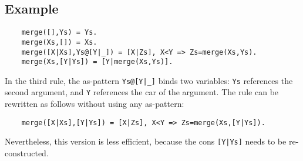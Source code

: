 \subsection*{Example}
\begin{verbatim}
    merge([],Ys) = Ys.
    merge(Xs,[]) = Xs.
    merge([X|Xs],Ys@[Y|_]) = [X|Zs], X<Y => Zs=merge(Xs,Ys). 
    merge(Xs,[Y|Ys]) = [Y|merge(Xs,Ys)].
\end{verbatim}
In the third rule, the as-pattern \texttt{Ys@[Y|\_]} binds two variables: \texttt{Ys} references the second argument, and \texttt{Y} references the car of the argument. The rule can be rewritten as follows without using any as-pattern:
\begin{verbatim}
    merge([X|Xs],[Y|Ys]) = [X|Zs], X<Y => Zs=merge(Xs,[Y|Ys]). 
\end{verbatim}
Nevertheless, this version is less efficient, because the cons \texttt{[Y|Ys]} needs to be re-constructed.

